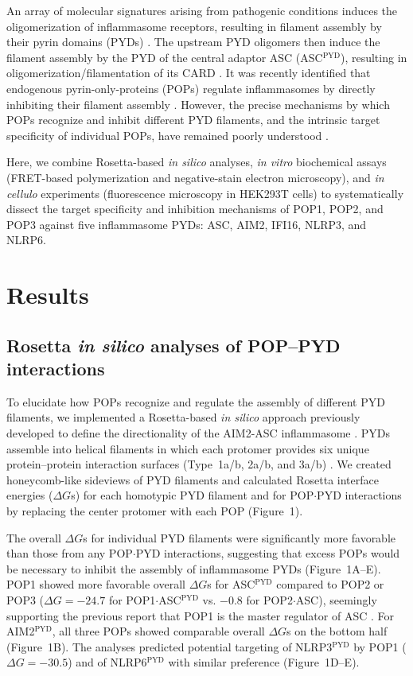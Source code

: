 \documentclass[11pt]{article}
\begin{document}
An array of molecular signatures arising from pathogenic conditions induces the oligomerization of inflammasome receptors, resulting in filament assembly by their pyrin domains (PYDs) \citep{lu2014,lu2015b}. The upstream PYD oligomers then induce the filament assembly by the PYD of the central adaptor ASC (ASC$^{\text{PYD}}$), resulting in oligomerization/filamentation of its CARD \citep{lu2014,kagan2014}. It was recently identified that endogenous pyrin-only-proteins (POPs) regulate inflammasomes by directly inhibiting their filament assembly \citep{dealmeida2015,khare2014,ratsimandresy2017}. However, the precise mechanisms by which POPs recognize and inhibit different PYD filaments, and the intrinsic target specificity of individual POPs, have remained poorly understood \citep{devi2020,indramohan2018}.

Here, we combine Rosetta-based \textit{in silico} analyses, \textit{in vitro} biochemical assays (FRET-based polymerization and negative-stain electron microscopy), and \textit{in cellulo} experiments (fluorescence microscopy in HEK293T cells) to systematically dissect the target specificity and inhibition mechanisms of POP1, POP2, and POP3 against five inflammasome PYDs: ASC, AIM2, IFI16, NLRP3, and NLRP6.

\section{Results}

\subsection{Rosetta \textit{in silico} analyses of POP--PYD interactions}

To elucidate how POPs recognize and regulate the assembly of different PYD filaments, we implemented a Rosetta-based \textit{in silico} approach previously developed to define the directionality of the AIM2-ASC inflammasome \citep{matyszewski2021}. PYDs assemble into helical filaments in which each protomer provides six unique protein--protein interaction surfaces (Type~1a/b, 2a/b, and 3a/b) \citep{lu2014,lu2015b}. We created honeycomb-like sideviews of PYD filaments and calculated Rosetta interface energies ($\Delta G$s) for each homotypic PYD filament and for POP$\cdot$PYD interactions by replacing the center protomer with each POP (Figure~1).

The overall $\Delta G$s for individual PYD filaments were significantly more favorable than those from any POP$\cdot$PYD interactions, suggesting that excess POPs would be necessary to inhibit the assembly of inflammasome PYDs (Figure~1A--E). POP1 showed more favorable overall $\Delta G$s for ASC$^{\text{PYD}}$ compared to POP2 or POP3 ($\Delta G = -24.7$ for POP1$\cdot$ASC$^{\text{PYD}}$ vs. $-0.8$ for POP2$\cdot$ASC), seemingly supporting the previous report that POP1 is the master regulator of ASC \citep{dealmeida2015}. For AIM2$^{\text{PYD}}$, all three POPs showed comparable overall $\Delta G$s on the bottom half (Figure~1B). The analyses predicted potential targeting of NLRP3$^{\text{PYD}}$ by POP1 ($\Delta G = -30.5$) and of NLRP6$^{\text{PYD}}$ with similar preference (Figure~1D--E).
\end{document}
